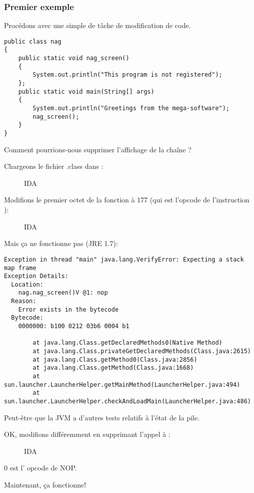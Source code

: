 \subsubsection{Premier exemple}

Procédons avec une simple de tâche de modification de code.

\begin{lstlisting}[style=customjava]
public class nag
{
	public static void nag_screen()
	{
		System.out.println("This program is not registered");
	};
	public static void main(String[] args) 
	{
		System.out.println("Greetings from the mega-software");
		nag_screen();
	}
}
\end{lstlisting}

Comment pourrions-nous supprimer l'affichage de la chaîne ?

Chargeons le fichier .class dans \IDA:

\begin{figure}[H]
\centering
{}
\caption{IDA}
\end{figure}

Modifions le premier octet de la fonction à 177 (qui est l'opcode de l'instruction ):

\begin{figure}[H]
\centering
{}
\caption{IDA}
\end{figure}

Mais ça ne fonctionne pas (JRE 1.7):

\begin{lstlisting}
Exception in thread "main" java.lang.VerifyError: Expecting a stack map frame
Exception Details:
  Location:
    nag.nag_screen()V @1: nop
  Reason:
    Error exists in the bytecode
  Bytecode:
    0000000: b100 0212 03b6 0004 b1

        at java.lang.Class.getDeclaredMethods0(Native Method)
        at java.lang.Class.privateGetDeclaredMethods(Class.java:2615)
        at java.lang.Class.getMethod0(Class.java:2856)
        at java.lang.Class.getMethod(Class.java:1668)
        at sun.launcher.LauncherHelper.getMainMethod(LauncherHelper.java:494)
        at sun.launcher.LauncherHelper.checkAndLoadMain(LauncherHelper.java:486)
\end{lstlisting}

Peut-être que la JVM a d'autres tests relatifs à l'état de la pile.

OK, modifions différemment en supprimant l'appel à :

\begin{figure}[H]
\centering
{}
\caption{IDA}
\end{figure}

0 est l' opcode de \ac{NOP}.

Maintenant, ça fonctionne!
